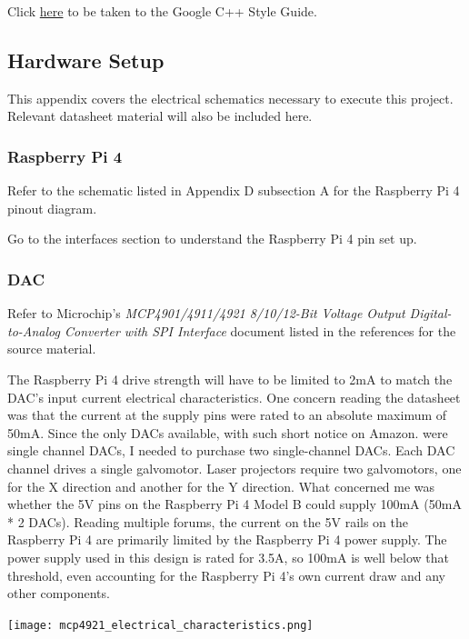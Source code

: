 \documentclass[journal]{IEEEtran}
\begin{document}
    Click {\href{https://google.github.io/styleguide/cppguide.html}{here}} to be taken to the Google C++ Style Guide.

    \subsection{Hardware Setup}
    This appendix covers the electrical schematics necessary to execute this project.
    Relevant datasheet material will also be included here.

    \subsubsection{Raspberry Pi 4}

    Refer to the schematic listed in Appendix D subsection A for the Raspberry Pi 4 pinout diagram.
    
    Go to the interfaces section to understand the Raspberry Pi 4 pin set up.

    \subsubsection{DAC} 
    
    Refer to Microchip's \emph{MCP4901/4911/4921 8/10/12-Bit Voltage Output Digital-to-Analog Converter with SPI Interface} document listed in the references for the source material.

    The Raspberry Pi 4 drive strength will have to be limited to 2mA to match the DAC's input current electrical characteristics.
    One concern reading the datasheet was that the current at the supply pins were rated to an absolute maximum of 50mA.
    Since the only DACs available, with such short notice on Amazon. were single channel DACs, I needed to purchase two single-channel DACs.
    Each DAC channel drives a single galvomotor. 
    Laser projectors require two galvomotors, one for the X direction and another for the Y direction.
    What concerned me was whether the 5V pins on the Raspberry Pi 4 Model B could supply 100mA (50mA * 2 DACs).
    Reading multiple forums, the current on the 5V rails on the Raspberry Pi 4 are primarily limited by the Raspberry Pi 4 power supply.
    The power supply used in this design is rated for 3.5A, so 100mA is well below that threshold, even accounting for the Raspberry Pi 4's own current draw and any other components. \newline 

    \texttt{[image: mcp4921\_electrical\_characteristics.png]}
\end{document}
